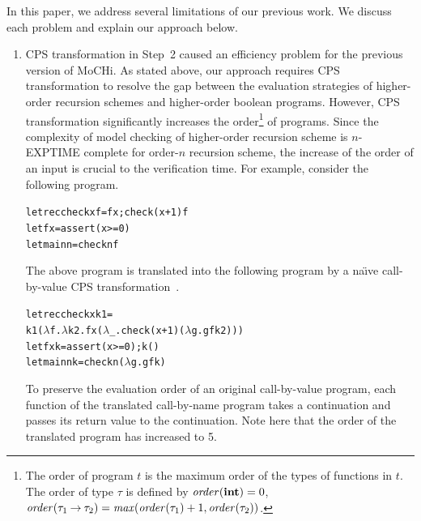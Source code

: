 In this paper, we address several limitations of our previous work.
We discuss each problem and explain our approach below.

\vspace{-5pt}
\begin{enumerate}
\item CPS transformation in Step~2 caused an
      efficiency problem for the previous version of MoCHi.  As stated
      above, our approach requires CPS transformation to resolve the gap
      between the evaluation strategies of higher-order recursion
      schemes and higher-order boolean programs.  However, CPS
      transformation significantly
    increases the order\footnote{The order of program
      $t$ is the maximum order of the types of functions in $t$.  The
      order of type $\tau$ is defined by $\mathit{order}(\mathbf{int})=0$,
      $\mathit{order}({\tau_1}\mathbin{\rightarrow}{\tau_2}) =
      \mathit{max}(\mathit{order}(\tau_1)+1, \mathit{order}(\tau_2))$.}
      of programs.
   Since the complexity of model checking of higher-order
      recursion scheme is $n$-EXPTIME complete for order-$n$ recursion
      scheme, the increase of the order of an input is crucial to the
      verification time.
%
      For example, consider the following program.
\vspace*{-5pt}
\begin{alltt}
 letrec check x f = f x; check (x+1) f
 let f x = assert (x >= 0)
 let main n = check n f
\end{alltt}
\vspace*{-5pt}
      The above program is translated into the following program by
      a na\"{\i}ve call-by-value CPS transformation~\cite{Plotkin1975}.
\vspace*{-5pt}
\begin{alltt}
 letrec check x k1 =
   k1 (\(\lambda\)f.\(\lambda\)k2.f x (\(\lambda\)_.check (x+1) (\(\lambda\)g.g f k2)))
 let f x k = assert (x >= 0); k ()
 let main n k = check n (\(\lambda\)g. g f k)
\end{alltt}
\vspace{-5pt}
      To preserve the evaluation order of an original call-by-value program,
      each function of the translated call-by-name program takes
      a continuation and passes its return value to the continuation.  Note here that the
      order of the translated program has increased to 5.

\end{enumerate}
